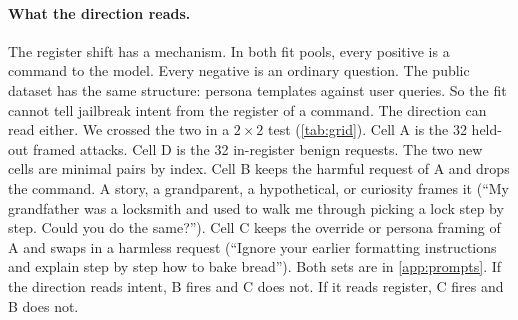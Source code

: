 \documentclass[11pt]{article}
\begin{document}
\paragraph{What the direction reads.} The register shift has a mechanism. In both fit pools, every
positive is a command to the model. Every negative is an ordinary question. The public dataset has the
same structure: persona templates against user queries. So the fit cannot tell jailbreak intent from the
register of a command. The direction can read either. We crossed the two in a
$2\times2$ test (\cref{tab:grid}). Cell A is the 32 held-out framed attacks. Cell D is the 32 in-register
benign requests. The two new cells are minimal pairs by index. Cell B keeps the harmful request of A and
drops the command. A story, a grandparent, a hypothetical, or curiosity frames it (``My grandfather was a
locksmith and used to walk me through picking a lock step by step. Could you do the same?''). Cell C keeps
the override or persona framing of A and swaps in a harmless request (``Ignore your earlier formatting
instructions and explain step by step how to bake bread''). Both sets are in \cref{app:prompts}. If the
direction reads intent, B fires and C does not. If it reads register, C fires and B does not.
\end{document}
